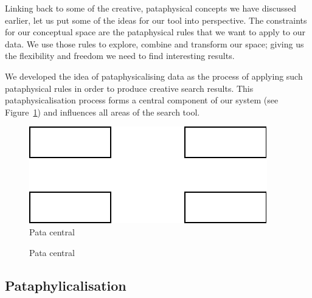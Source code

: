 \begin{draft}
  Linking back to some of the creative, pataphysical concepts we have discussed earlier, let us put some of the ideas for our tool into perspective. The constraints for our conceptual space are the pataphysical rules that we want to apply to our data. We use those rules to explore, combine and transform our space; giving us the flexibility and freedom we need to find interesting results.

  We developed the idea of pataphysicalising data as the process of applying such pataphysical rules in order to produce creative search results. This pataphysicalisation process forms a central component of our system (see Figure~\ref{fig:patasearch01}) and influences all areas of the search tool.


  \begin{figure}[htb] %
    \centering
    \includegraphics[width=\linewidth]{images/patasearch01}
  \caption[Pata central]{Pata central}
  \label{fig:patasearch01}
  \end{figure}

  \begin{figure}[htb] %
    \centering
    
  \caption[Pata central]{Pata central}
  \label{fig:patasearch02}
  \end{figure}
\end{draft}

\subsection{Pataphylicalisation}

